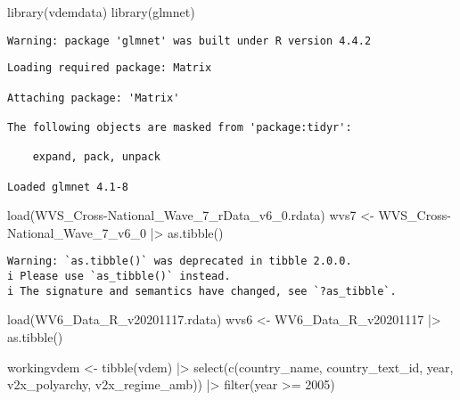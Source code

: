 \documentclass[
  letterpaper,
  DIV=11,
  numbers=noendperiod]{scrartcl}
\newenvironment{Shaded}{\begin{snugshade}}{\end{snugshade}}
\newcommand{\AttributeTok}[1]{\textcolor[rgb]{0.40,0.45,0.13}{#1}}
\newcommand{\DecValTok}[1]{\textcolor[rgb]{0.68,0.00,0.00}{#1}}
\newcommand{\FunctionTok}[1]{\textcolor[rgb]{0.28,0.35,0.67}{#1}}
\newcommand{\NormalTok}[1]{\textcolor[rgb]{0.00,0.23,0.31}{#1}}
\newcommand{\OtherTok}[1]{\textcolor[rgb]{0.00,0.23,0.31}{#1}}
\newcommand{\SpecialCharTok}[1]{\textcolor[rgb]{0.37,0.37,0.37}{#1}}
\newcommand{\StringTok}[1]{\textcolor[rgb]{0.13,0.47,0.30}{#1}}
\begin{document}
\begin{Shaded}
\begin{Highlighting}[]
\FunctionTok{library}\NormalTok{(vdemdata)}
\FunctionTok{library}\NormalTok{(glmnet)}
\end{Highlighting}
\end{Shaded}

\begin{verbatim}
Warning: package 'glmnet' was built under R version 4.4.2
\end{verbatim}

\begin{verbatim}
Loading required package: Matrix

Attaching package: 'Matrix'

The following objects are masked from 'package:tidyr':

    expand, pack, unpack

Loaded glmnet 4.1-8
\end{verbatim}

\begin{Shaded}
\begin{Highlighting}[]
\FunctionTok{load}\NormalTok{(}\StringTok{\textquotesingle{}WVS\_Cross{-}National\_Wave\_7\_rData\_v6\_0.rdata\textquotesingle{}}\NormalTok{)}
\NormalTok{wvs7 }\OtherTok{\textless{}{-}} \StringTok{\textasciigrave{}}\AttributeTok{WVS\_Cross{-}National\_Wave\_7\_v6\_0}\StringTok{\textasciigrave{}} \SpecialCharTok{|\textgreater{}} \FunctionTok{as.tibble}\NormalTok{()}
\end{Highlighting}
\end{Shaded}

\begin{verbatim}
Warning: `as.tibble()` was deprecated in tibble 2.0.0.
i Please use `as_tibble()` instead.
i The signature and semantics have changed, see `?as_tibble`.
\end{verbatim}

\begin{Shaded}
\begin{Highlighting}[]
\FunctionTok{load}\NormalTok{(}\StringTok{\textquotesingle{}WV6\_Data\_R\_v20201117.rdata\textquotesingle{}}\NormalTok{)}
\NormalTok{wvs6 }\OtherTok{\textless{}{-}} \StringTok{\textasciigrave{}}\AttributeTok{WV6\_Data\_R\_v20201117}\StringTok{\textasciigrave{}} \SpecialCharTok{|\textgreater{}} \FunctionTok{as.tibble}\NormalTok{()}

\NormalTok{workingvdem }\OtherTok{\textless{}{-}} \FunctionTok{tibble}\NormalTok{(vdem) }\SpecialCharTok{|\textgreater{}}
  \FunctionTok{select}\NormalTok{(}\FunctionTok{c}\NormalTok{(country\_name, country\_text\_id, year, v2x\_polyarchy, v2x\_regime\_amb)) }\SpecialCharTok{|\textgreater{}}
  \FunctionTok{filter}\NormalTok{(year }\SpecialCharTok{\textgreater{}=} \DecValTok{2005}\NormalTok{)}
\end{Highlighting}
\end{Shaded}
\end{document}
